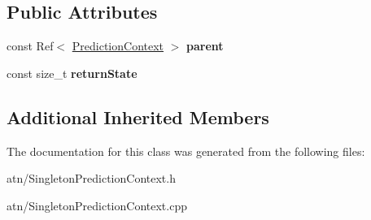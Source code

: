 \subsection*{Public Attributes}
\begin{DoxyCompactItemize}
\item 
\mbox{\label{classantlr4_1_1atn_1_1SingletonPredictionContext_afefd7a72db8ae9da2cf7e33ec1d0c921}} 
const Ref$<$ \hyperlink{classantlr4_1_1atn_1_1PredictionContext}{Prediction\+Context} $>$ {\bfseries parent}
\item 
\mbox{\label{classantlr4_1_1atn_1_1SingletonPredictionContext_a7fcf91e83cd1d904d964ae9a67779653}} 
const size\+\_\+t {\bfseries return\+State}
\end{DoxyCompactItemize}
\subsection*{Additional Inherited Members}


The documentation for this class was generated from the following files\+:\begin{DoxyCompactItemize}
\item 
atn/Singleton\+Prediction\+Context.\+h\item 
atn/Singleton\+Prediction\+Context.\+cpp\end{DoxyCompactItemize}
